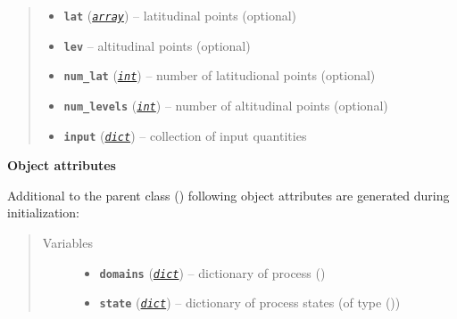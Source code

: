 \documentclass[a4paper,10pt,english]{sphinxmanual}
\begin{document}
\begin{fulllineitems}
\begin{quote}
\begin{description}
\begin{itemize}
\item {} 
\textbf{\texttt{lat}} (\href{http://docs.python.org/2.7/library/array.html\#module-array}{\emph{\texttt{array}}}) -- latitudinal points (optional)

\item {} 
\textbf{\texttt{lev}} -- altitudinal points (optional)

\item {} 
\textbf{\texttt{num\_lat}} (\href{http://docs.python.org/2.7/library/functions.html\#int}{\emph{\texttt{int}}}) -- number of latitudional points (optional)

\item {} 
\textbf{\texttt{num\_levels}} (\href{http://docs.python.org/2.7/library/functions.html\#int}{\emph{\texttt{int}}}) -- number of altitudinal points (optional)

\item {} 
\textbf{\texttt{input}} (\href{http://docs.python.org/2.7/library/stdtypes.html\#dict}{\emph{\texttt{dict}}}) -- collection of input quantities

\end{itemize}

\end{description}\end{quote}

\textbf{Object attributes}

Additional to the parent class {\hyperref[api/climlab.process:climlab.process.process.Process]{\emph{}}} ()
following object attributes are generated during initialization:
\begin{quote}\begin{description}
\item[{Variables}] \leavevmode\begin{itemize}
\item {} 
\textbf{\texttt{domains}} (\href{http://docs.python.org/2.7/library/stdtypes.html\#dict}{\emph{\texttt{dict}}}) -- dictionary of process {\hyperref[api/climlab.domain:climlab.domain.domain._Domain]{\emph{}}} ()

\item {} 
\textbf{\texttt{state}} (\href{http://docs.python.org/2.7/library/stdtypes.html\#dict}{\emph{\texttt{dict}}}) -- dictionary of process states 
(of type {\hyperref[api/climlab.domain:climlab.domain.field.Field]{\emph{}}} ())


\end{itemize}
\end{description}
\end{quote}
\end{fulllineitems}
\end{document}
